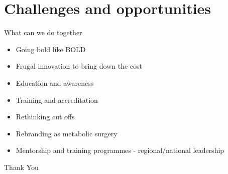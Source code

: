 \documentclass[11pt]{beamer}
\begin{document}
  \section{Challenges and opportunities}
  \begin{frame}{What can we do together  }
   \begin{itemize}
   
   \item Going bold like BOLD \pause
   \item Frugal innovation to bring down the cost \pause
   \item Education and awareness \pause
   \item Training and accreditation \pause
   \item Rethinking cut offs \pause
   \item Rebranding as metabolic surgery \pause
   \item Mentorship and training programmes - regional/national leadership
   	
   \end{itemize}
  \end{frame} 
 \begin{frame}{  }
     \centering \Huge {Thank You}
 \end{frame} 
\end{document}

